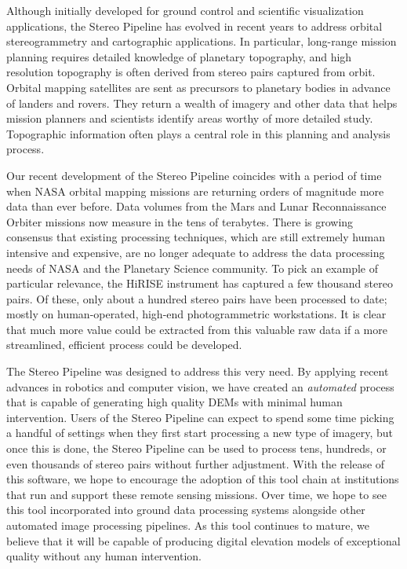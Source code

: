 Although initially developed for ground control and scientific
visualization applications, the Stereo Pipeline has evolved in recent
years to address orbital stereogrammetry and cartographic
applications.  In particular, long-range mission planning requires
detailed knowledge of planetary topography, and high resolution
topography is often derived from stereo pairs captured from orbit.
Orbital mapping satellites are sent as precursors to planetary bodies
in advance of landers and rovers.  They return a wealth of imagery and
other data that helps mission planners and scientists identify areas
worthy of more detailed study. Topographic information often plays a
central role in this planning and analysis process.

Our recent development of the Stereo Pipeline coincides with a
period of time when \ac{NASA} orbital mapping missions are returning
orders of magnitude more data than ever before.  Data volumes from
the Mars and Lunar Reconnaissance Orbiter missions now measure in
the tens of terabytes.  There is growing consensus that existing
processing techniques, which are still extremely human intensive
and expensive, are no longer adequate to address the data processing
needs of \ac{NASA} and the Planetary Science community.  To pick
an example of particular relevance, the \ac{HiRISE} instrument has
captured a few thousand stereo pairs.
Of these, only about a hundred stereo pairs have been processed to
date; mostly on human-operated, high-end photogrammetric workstations.
It is clear that much more value could be extracted from this
valuable raw data if a more streamlined, efficient process could be
developed.

The Stereo Pipeline was designed to address this very need.  By
applying recent advances in robotics and computer vision, we have
created an {\em automated} process that is capable of generating high
quality \acp{DEM} with minimal human intervention.  Users of the Stereo
Pipeline can expect to spend some time picking a handful of settings
when they first start processing a new type of imagery, but once this
is done, the Stereo Pipeline can be used to process tens, hundreds, or
even thousands of stereo pairs without further adjustment.  With the
release of this software, we hope to encourage the adoption of this
tool chain at institutions that run and support these remote sensing
missions.  Over time, we hope to see this tool incorporated into
ground data processing systems alongside other automated image
processing pipelines.  As this tool continues to mature, we believe
that it will be capable of producing digital elevation models of
exceptional quality without any human intervention.

